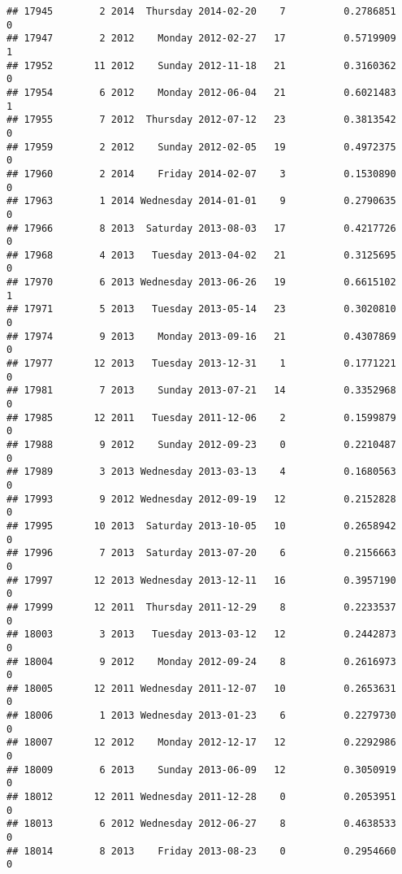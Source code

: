 \documentclass[
]{article}
\begin{document}
\begin{verbatim}
## 17945        2 2014  Thursday 2014-02-20    7          0.2786851             0
## 17947        2 2012    Monday 2012-02-27   17          0.5719909             1
## 17952       11 2012    Sunday 2012-11-18   21          0.3160362             0
## 17954        6 2012    Monday 2012-06-04   21          0.6021483             1
## 17955        7 2012  Thursday 2012-07-12   23          0.3813542             0
## 17959        2 2012    Sunday 2012-02-05   19          0.4972375             0
## 17960        2 2014    Friday 2014-02-07    3          0.1530890             0
## 17963        1 2014 Wednesday 2014-01-01    9          0.2790635             0
## 17966        8 2013  Saturday 2013-08-03   17          0.4217726             0
## 17968        4 2013   Tuesday 2013-04-02   21          0.3125695             0
## 17970        6 2013 Wednesday 2013-06-26   19          0.6615102             1
## 17971        5 2013   Tuesday 2013-05-14   23          0.3020810             0
## 17974        9 2013    Monday 2013-09-16   21          0.4307869             0
## 17977       12 2013   Tuesday 2013-12-31    1          0.1771221             0
## 17981        7 2013    Sunday 2013-07-21   14          0.3352968             0
## 17985       12 2011   Tuesday 2011-12-06    2          0.1599879             0
## 17988        9 2012    Sunday 2012-09-23    0          0.2210487             0
## 17989        3 2013 Wednesday 2013-03-13    4          0.1680563             0
## 17993        9 2012 Wednesday 2012-09-19   12          0.2152828             0
## 17995       10 2013  Saturday 2013-10-05   10          0.2658942             0
## 17996        7 2013  Saturday 2013-07-20    6          0.2156663             0
## 17997       12 2013 Wednesday 2013-12-11   16          0.3957190             0
## 17999       12 2011  Thursday 2011-12-29    8          0.2233537             0
## 18003        3 2013   Tuesday 2013-03-12   12          0.2442873             0
## 18004        9 2012    Monday 2012-09-24    8          0.2616973             0
## 18005       12 2011 Wednesday 2011-12-07   10          0.2653631             0
## 18006        1 2013 Wednesday 2013-01-23    6          0.2279730             0
## 18007       12 2012    Monday 2012-12-17   12          0.2292986             0
## 18009        6 2013    Sunday 2013-06-09   12          0.3050919             0
## 18012       12 2011 Wednesday 2011-12-28    0          0.2053951             0
## 18013        6 2012 Wednesday 2012-06-27    8          0.4638533             0
## 18014        8 2013    Friday 2013-08-23    0          0.2954660             0

\end{verbatim}
\end{document}
